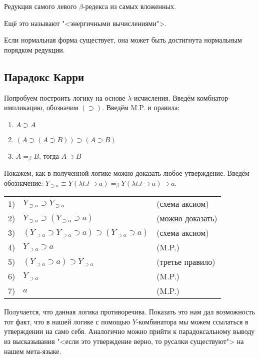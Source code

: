 \begin{definition}
    Редукция самого левого $\beta$-редекса из самых вложенных.
\end{definition}
Ещё это называют "<энергичными вычислениями">.

\begin{statement}
    Если нормальная форма существует, она может быть достигнута нормальным порядком редукции.
\end{statement}

\subsection{\texorpdfstring{Парадокс Карри}{Curry's paradox}}

Попробуем построить логику на основе $\lambda$-исчисления.
Введём комбнатор-импликацию, обозначим $(\supset)$. Введём M.P. и правила:
\begin{enumerate}
    \item $A \supset A$
    \item $(A \supset (A \supset B)) \supset (A \supset B)$
    \item $A =_{\beta} B$, тогда $A \supset B$
\end{enumerate}

Покажем, как в полученной логике можно доказать любое утверждение.
Введём обозначение: $Y_{\supset a} \equiv Y (\lambda t . t \supset a) =_{\beta} Y (\lambda t . t \supset a) \supset a$.

\begin{tabular}{lll}
    1) & $Y_{\supset a} \supset Y_{\supset a}$ & (схема аксиом) \\
    2) & $Y_{\supset a} \supset (Y_{\supset a} \supset a)$ & (можно доказать) \\
    3) & $(Y_{\supset a} \supset Y_{\supset a} \supset a) \supset (Y_{\supset a} \supset a)$ & (схема аксиом) \\
    4) & $Y_{\supset a} \supset a$ & (M.P.) \\
    5) & $(Y_{\supset a} \supset a) \supset Y_{\supset a}$ & (третье правило) \\
    6) & $Y_{\supset a}$ & (M.P.) \\
    7) & $a$ & (M.P.)
\end{tabular}

Получается, что данная логика противоречива. Показать это нам дал возможность тот факт,
что в нашей логике с помощью $Y$-комбинатора мы можем ссылаться в утверждении на само себя.
Аналогично можно прийти к парадоксальному выводу из высказывания "<если это утверждение верно, то русалки существуют"> на нашем мета-языке.

